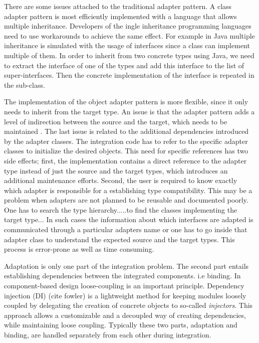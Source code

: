 There are some issues attached to the traditional adapter pattern.
A class adapter pattern is most efficiently implemented with a language that allows multiple inheritance. 
Developers of the ingle inheritance programming languages need to use workarounds to achieve the same effect.
For example in Java multiple inheritance is simulated with the usage of interfaces since a class can implement multiple of them. 
In order to inherit from two concrete types using Java, we need to extract the interface of one of the types and add this interface to the list of super-interfaces. 
Then the concrete implementation of the interface is repeated in the sub-class. 

The implementation of the object adapter pattern is more flexible, since it only needs to inherit from the target type. 
An issue is that the adapter pattern adds a level of indirection between the source and the target, which needs to be maintained . 
The last issue is related to the additional dependencies introduced by the adapter classes. 
The integration code has to refer to the specific adapter classes to initialize the desired objects. 
This need for specific references has two side effects; first, the implementation contains a direct reference to the adapter type instead of just the source and the target types, which introduces an additional maintenance efforts. 
Second, the user is required to know exactly which adapter is responsible for a establishing type compatibility.
This may be a problem when adapters are not planned to be reusable and documented poorly. 
One has to search the type hierarchy.....to find the classes implementing the target type...
In such cases the information about which interfaces are adapted is communicated through a particular adapters name or one has to go inside that adapter class to understand the expected source and the target types. 
This process is error-prone as well as time consuming.

Adaptation is only one part of the integration problem. 
The second part entails establishing dependencies between the integrated components. i.e binding. 
In component-based design loose-coupling is an important principle.  
Dependency injection (DI) (cite fowler) is a lightweight method for keeping modules loosely coupled by delegating the creation of concrete objects to so-called \emph{injectors}. 
This approach allows a customizable and a decoupled way of creating dependencies, while maintaining loose coupling. 
Typically these two parts, adaptation and binding, are handled separately from each other during integration. 


